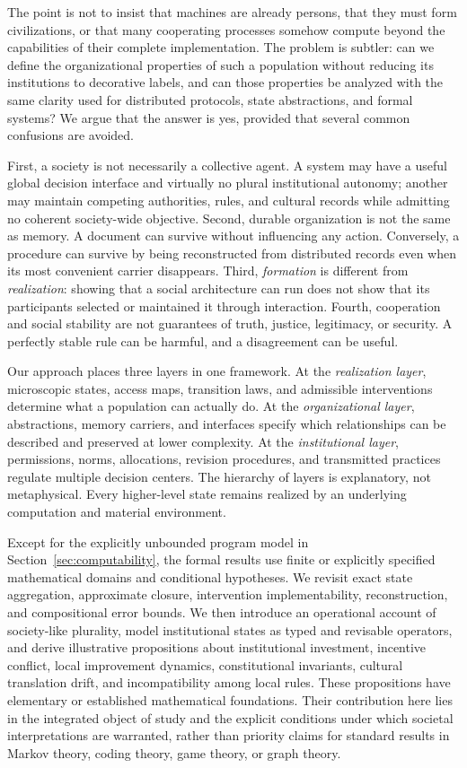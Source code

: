 \documentclass[11pt,letterpaper]{article}
\theoremstyle{plain}
\theoremstyle{definition}
\theoremstyle{remark}
\begin{document}
The point is not to insist that machines are already persons, that they must form civilizations, or that many cooperating processes somehow compute beyond the capabilities of their complete implementation. The problem is subtler: can we define the organizational properties of such a population without reducing its institutions to decorative labels, and can those properties be analyzed with the same clarity used for distributed protocols, state abstractions, and formal systems? We argue that the answer is yes, provided that several common confusions are avoided.

First, a society is not necessarily a collective agent. A system may have a useful global decision interface and virtually no plural institutional autonomy; another may maintain competing authorities, rules, and cultural records while admitting no coherent society-wide objective. Second, durable organization is not the same as memory. A document can survive without influencing any action. Conversely, a procedure can survive by being reconstructed from distributed records even when its most convenient carrier disappears. Third, \emph{formation} is different from \emph{realization}: showing that a social architecture can run does not show that its participants selected or maintained it through interaction. Fourth, cooperation and social stability are not guarantees of truth, justice, legitimacy, or security. A perfectly stable rule can be harmful, and a disagreement can be useful.

Our approach places three layers in one framework. At the \emph{realization layer}, microscopic states, access maps, transition laws, and admissible interventions determine what a population can actually do. At the \emph{organizational layer}, abstractions, memory carriers, and interfaces specify which relationships can be described and preserved at lower complexity. At the \emph{institutional layer}, permissions, norms, allocations, revision procedures, and transmitted practices regulate multiple decision centers. The hierarchy of layers is explanatory, not metaphysical. Every higher-level state remains realized by an underlying computation and material environment.

Except for the explicitly unbounded program model in Section~\ref{sec:computability}, the formal results use finite or explicitly specified mathematical domains and conditional hypotheses. We revisit exact state aggregation, approximate closure, intervention implementability, reconstruction, and compositional error bounds. We then introduce an operational account of society-like plurality, model institutional states as typed and revisable operators, and derive illustrative propositions about institutional investment, incentive conflict, local improvement dynamics, constitutional invariants, cultural translation drift, and incompatibility among local rules. These propositions have elementary or established mathematical foundations. Their contribution here lies in the integrated object of study and the explicit conditions under which societal interpretations are warranted, rather than priority claims for standard results in Markov theory, coding theory, game theory, or graph theory.
\end{document}
